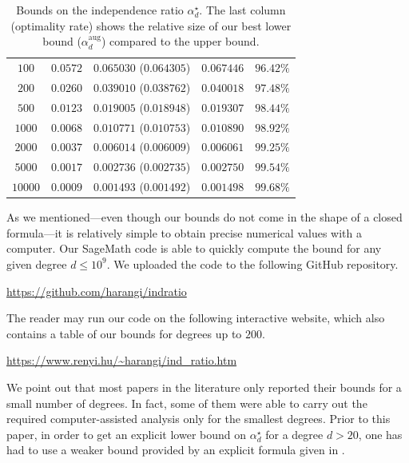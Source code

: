 \documentclass[12pt]{amsart}
\theoremstyle{definition}
\newcommand\alstar{\alpha^{\star}}
\newcommand\alaug{\alpha^{\mathrm{aug}}}
\begin{document}
\begin{table}
\begin{tabular}{c||r|r|r|r}
$100$ & \cite{wormald1995differential} \quad $0.0572$ 
& $0.065030$ \;($0.064305$) & $0.067446$ & $96.42\%$\\
$200$ & \cite[Thm 4]{wormald1995differential} \quad $0.0260$ 
& $0.039010$ \;($0.038762$) & $0.040018$ & $97.48\%$\\
$500$ & \cite[Thm 4]{wormald1995differential} \quad $0.0123$ 
& $0.019005$ \;($0.018948$) & $0.019307$ & $98.44\%$\\
$1000$ & \cite[Thm 4]{wormald1995differential} \quad $0.0068$ 
& $0.010771$ \;($0.010753$) & $0.010890$ & $98.92\%$\\
$2000$ & \cite[Thm 4]{wormald1995differential} \quad $0.0037$ 
& $0.006014$ \;($0.006009$) & $0.006061$ & $99.25\%$\\
$5000$ & \cite[Thm 4]{wormald1995differential} \quad $0.0017$ 
& $0.002736$ \;($0.002735$) & $0.002750$ & $99.54\%$\\
$10000$ & \cite[Thm 4]{wormald1995differential} \quad $0.0009$ 
& $0.001493$ \;($0.001492$) & $0.001498$ & $99.68\%$
\end{tabular}
\caption{Bounds on the independence ratio $\alstar_d$. The last column (optimality rate) shows the relative size of our best lower bound ($\alaug_d$) compared to the upper bound.}
\label{tab:bound_comparision}
\end{table}
%

As we mentioned---even though our bounds do not come in the shape of a closed formula---it is relatively simple to obtain precise numerical values with a computer. Our SageMath code is able to quickly compute the bound for any given degree $d \leq 10^9$. We uploaded the code to the following GitHub repository.

\begin{center}
\url{https://github.com/harangi/indratio}
\end{center}

The reader may run our code on the following interactive website, which also contains a table of our bounds for degrees up to $200$.

\begin{center}
\url{https://www.renyi.hu/~harangi/ind_ratio.htm}
\end{center}

We point out that most papers in the literature only reported their bounds for a small number of degrees. In fact, some of them were able to carry out the required computer-assisted analysis only for the smallest degrees. Prior to this paper, in order to get an explicit lower bound on $\alstar_d$ for a degree $d>20$, one has had to use a weaker bound provided by an explicit formula given in \cite[Theorem 4]{wormald1995differential}. 
\end{document}
